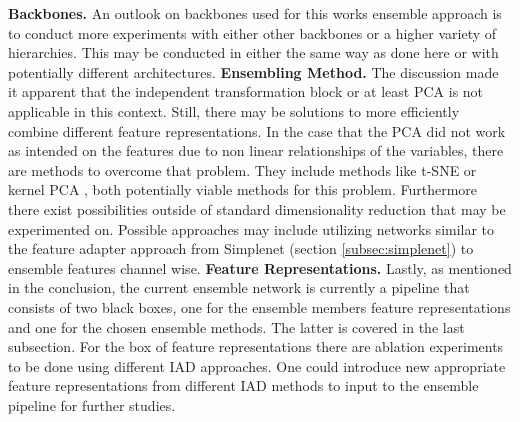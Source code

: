\textbf{Backbones.} An outlook on backbones used for this works ensemble approach is to conduct more experiments with either other backbones or a higher variety of hierarchies. 
This may be conducted in either the same way as done here or with potentially different architectures.
\newline\newline
\textbf{Ensembling Method.} The discussion made it apparent that the independent transformation block \cite{EnsembleHeller2023} or at least PCA is not applicable in this context. 
Still, there may be solutions to more efficiently combine different feature representations. In the case that the PCA did not work as intended on the features due to non linear 
relationships of the variables, there are methods to overcome that problem. They include methods like t-SNE\cite{tSNE} or kernel PCA \cite{Hoffmann_2007kernelPCA}, both potentially 
viable methods for this problem. Furthermore there exist possibilities outside of standard dimensionality reduction that may be experimented on. Possible approaches may include 
utilizing networks similar to the feature adapter approach from Simplenet (section \ref{subsec:simplenet}) to ensemble features channel wise.
\newline\newline
\textbf{Feature Representations.} Lastly, as mentioned in the conclusion, the current ensemble network is currently a pipeline that consists of two black boxes, one for the ensemble 
members feature representations and one for the chosen ensemble methods. The latter is covered in the last subsection. For the box of feature representations there are ablation 
experiments to be done using different IAD approaches. One could introduce new appropriate feature representations from different IAD methods to input to the ensemble pipeline for 
further studies.

